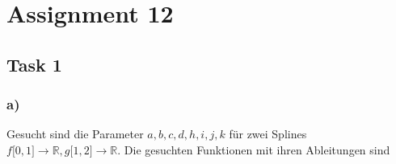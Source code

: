 \chapter{Assignment 12}\label{ass12}

\section{Task 1}\label{ass12_t1}

\subsection{a)}

Gesucht sind die Parameter $a,b,c,d,h,i,j,k$ für zwei Splines $f\mathopen[0,1 \mathclose]\rightarrow \mathbb{R} ,g\mathopen[1,2\mathclose]\rightarrow \mathbb{R}$. Die gesuchten Funktionen mit ihren Ableitungen sind


